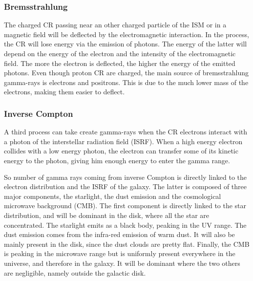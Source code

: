 \subsubsection{Bremsstrahlung}


The charged CR passing near an other charged particle of the ISM or in a magnetic field will be deflected by the electromagnetic interaction. In the process, the CR will lose energy via the emission of photons. The energy of the latter will depend on the energy of the electron and the intensity of the electromagnetic field. The more the electron is deflected, the higher the energy of the emitted photons.
Even though proton CR are charged, the main source of bremsstrahlung gamma-rays is electrons and positrons. This is due to the much lower mass of the electrons, making them easier to deflect.



\subsubsection{Inverse Compton}


A third process can take create gamma-rays when the CR electrons interact with a photon of the interstellar radiation field (ISRF). When a high energy electron collides with a low energy photon, the electron can transfer some of its kinetic energy to the photon, giving him enough energy to enter the gamma range.

So number of gamma rays coming from inverse Compton is directly linked to the electron distribution and the ISRF of the galaxy. The latter is composed of three major components, the starlight, the dust emission and the cosmological microwave background (CMB). The first component is directly linked to the star distribution, and will be dominant in the disk, where all the star are concentrated. The starlight emits as a black body, peaking in the UV range. The dust emission comes from the infra-red emission of warm dust. It will also be mainly present in the disk, since the dust clouds are pretty flat. Finally, the CMB is peaking in the microwave range but is uniformly present everywhere in the universe, and therefore in the galaxy. It will be dominant where the two others are negligible, namely outside the galactic disk.



